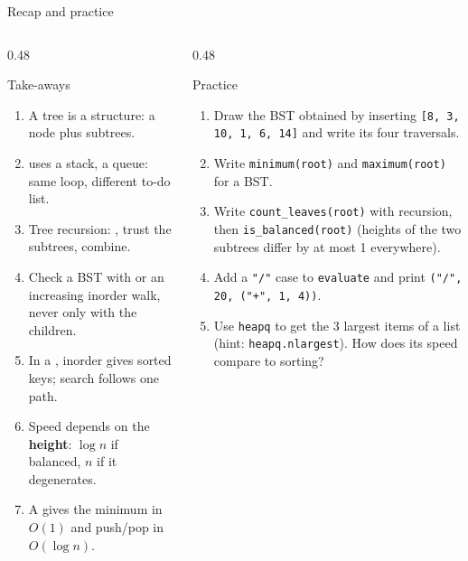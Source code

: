 \documentclass[aspectratio=169,10pt]{beamer}
\begin{document}
\begin{frame}{Recap and practice}
\begin{columns}[T]
\begin{column}{0.48\textwidth}
\begin{block}{Take-aways}
{\footnotesize
\begin{enumerate}\setlength\itemsep{2pt}
\item A tree is a  structure: a node plus subtrees.
\item {} uses a stack,  a queue: same loop, different to-do list.
\item Tree recursion: , trust the subtrees, combine.
\item Check a BST with  or an increasing inorder walk, never only with the children.
\item In a , inorder gives sorted keys; search follows one path.
\item Speed depends on the \textbf{height}: $\log n$ if balanced, $n$ if it degenerates.
\item A  gives the minimum in $O(1)$ and push/pop in $O(\log n)$.
\end{enumerate}}
\end{block}
\end{column}
\begin{column}{0.48\textwidth}
\begin{block}{Practice}
{\footnotesize
\begin{enumerate}\setlength\itemsep{2pt}
\item Draw the BST obtained by inserting \texttt{[8, 3, 10, 1, 6, 14]} and write its four traversals.
\item Write \texttt{minimum(root)} and \texttt{maximum(root)} for a BST.
\item Write \texttt{count\_leaves(root)} with recursion, then \texttt{is\_balanced(root)} (heights of the two subtrees differ by at most 1 everywhere).
\item Add a \texttt{"/"} case to \texttt{evaluate} and print \texttt{("/", 20, ("+", 1, 4))}.
\item Use \texttt{heapq} to get the 3 largest items of a list (hint: \texttt{heapq.nlargest}). How does its speed compare to sorting?
\end{enumerate}}
\end{block}
\end{column}
\end{columns}
\end{frame}
\end{document}
